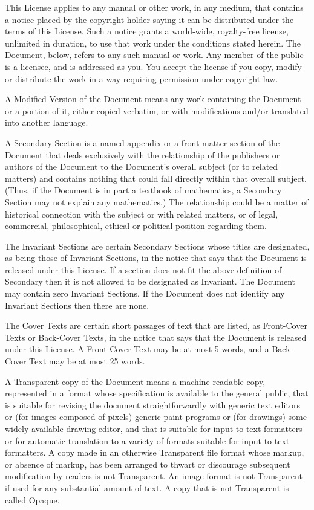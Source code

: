 \documentclass[captions=tableheading]{scrbook}
\begin{document}
This License applies to any manual or other work, in any medium, that contains a notice placed by the copyright holder saying it can be distributed under the terms of this License. Such a notice grants a world-wide, royalty-free license, unlimited in duration, to use that work under the conditions stated herein. The Document, below, refers to any such manual or work. Any member of the public is a licensee, and is addressed as you. You accept the license if you copy, modify or distribute the work in a way requiring permission under copyright law.

A Modified Version of the Document means any work containing the Document or a portion of it, either copied verbatim, or with modifications and/or translated into another language.

A Secondary Section is a named appendix or a front-matter section of the Document that deals exclusively with the relationship of the publishers or authors of the Document to the Document's overall subject (or to related matters) and contains nothing that could fall directly within that overall subject. (Thus, if the Document is in part a textbook of mathematics, a Secondary Section may not explain any mathematics.) The relationship could be a matter of historical connection with the subject or with related matters, or of legal, commercial, philosophical, ethical or political position regarding them.

The Invariant Sections are certain Secondary Sections whose titles are designated, as being those of Invariant Sections, in the notice that says that the Document is released under this License. If a section does not fit the above definition of Secondary then it is not allowed to be designated as Invariant. The Document may contain zero Invariant Sections. If the Document does not identify any Invariant Sections then there are none.

The Cover Texts are certain short passages of text that are listed, as Front-Cover Texts or Back-Cover Texts, in the notice that says that the Document is released under this License. A Front-Cover Text may be at most 5 words, and a Back-Cover Text may be at most 25 words.

A Transparent copy of the Document means a machine-readable copy, represented in a format whose specification is available to the general public, that is suitable for revising the document straightforwardly with generic text editors or (for images composed of pixels) generic paint programs or (for drawings) some widely available drawing editor, and that is suitable for input to text formatters or for automatic translation to a variety of formats suitable for input to text formatters. A copy made in an otherwise Transparent file format whose markup, or absence of markup, has been arranged to thwart or discourage subsequent modification by readers is not Transparent. An image format is not Transparent if used for any substantial amount of text. A copy that is not Transparent is called Opaque.
\end{document}

